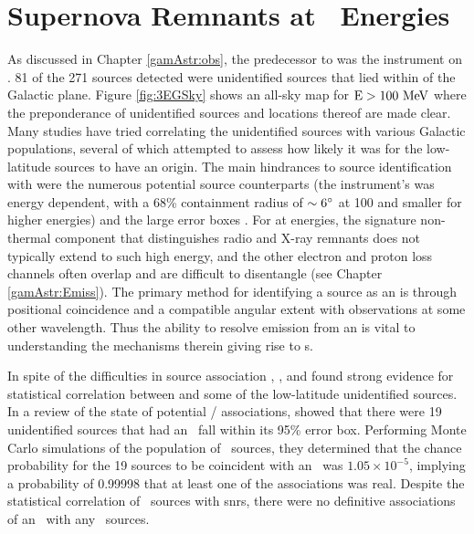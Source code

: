\section{\label{Rems:latGam}Supernova Remnants at \gam~Energies}
As discussed in Chapter \ref{gamAstr:obs}, the predecessor to \FermiLat{} was the \egret{} instrument on \cgro{}. 81 of the 271 \egret{} sources detected were unidentified sources that lied within \blat {} of the Galactic plane.  Figure \ref{fig:3EGSky} shows an \egret{} all-sky map for ${\rm E > 100 ~\mathrm{MeV}}$ where the preponderance of unidentified sources and locations thereof are made clear. Many studies have tried correlating the unidentified \egret{} sources with various Galactic populations, several of which attempted to assess how likely it was for the low-latitude sources to have an \snr{} origin. The main hindrances to source identification with \egret{} were the numerous potential source counterparts (the instrument's \psf{} was energy dependent, with a 68\% containment radius of ${\rm \sim 6 ^\circ}$ at 100\mev{} and smaller for higher energies) and the large \egret{} error boxes \citep{Hartman99}. For \snrs{} at \gam{} energies, the signature non-thermal \sync{} component that distinguishes radio and X-ray remnants does not typically extend to such high energy, and the other electron and proton loss channels often overlap and are difficult to disentangle (see Chapter \ref{gamAstr:Emiss}). The primary method for identifying a \gam{} source as an \snr{} is through positional coincidence and a compatible angular extent with observations at some other wavelength. Thus the ability to resolve emission from an \snr{} is vital to understanding the mechanisms therein giving rise to \gam{}s.

In spite of the difficulties in \egret{} source association \cite{Sturner95}, \cite{Esposito96}, and \cite{Romero99} found strong evidence for statistical correlation between \snrs{} and some of the low-latitude unidentified sources. In a review of the state of potential \snr{} /  \egret{} associations, \cite{Torres03} showed that there were 19 unidentified \egret{} sources that had an \snr~fall within its 95\% error box. Performing Monte Carlo simulations of the population of  \egret~sources, they determined that the chance probability for the 19 sources to be coincident with an \snr~was $1.05 \times 10^{-5}$, implying a probability of 0.99998 that at least one of the associations was real. Despite the statistical correlation of \egret~sources with \glspl{snr}, there were no definitive associations of an \snr~with any \egret~sources.

